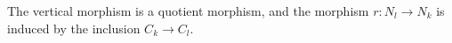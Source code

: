 The vertical morphism is a quotient morphism, and the morphism $r: N_l \rightarrow N_k$ is induced by the inclusion $C_k \rightarrow C_l$.
